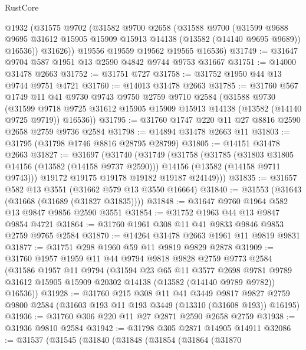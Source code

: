 \begin{lexlean}{RustCore}
\begin{coremodule}
      @1932
      (@31575
        @9702
        (@31582
          @9700
          @2658
          (@31588
            @9700
            (@31599
              @9688
              @9695
              @31612
              @15905
              @15909
              @15913
              @14138
              (@13582 (@14140 @9695 @9689))
              @16536))
          @31626))
      @19556
      @19559
      @19562
      @19565
      @16536)
@31749 := @31647 @9704 @587 @1951 @13 @2590 @4842 @9744 @9753 @31667
@31751 := @14000 @31478 @2663
@31752 := @31751 @727
@31758 := @31752 @1950 @44 @13 @9744 @9751 @4721
@31760 := @14013 @31478 @2663
@31785 := @31760
    @567
    @1749
    @11
    @41
    @9730
    @9743
    @9750
    @2759
    @9710
    @2584
    (@31588
      @9730
      (@31599 @9718 @9725 @31612 @15905 @15909 @15913 @14138 (@13582 (@14140 @9725 @9719)) @16536))
@31795 := @31760 @1747 @220 @11 @27 @8816 @2590 @2658 @2759 @9736 @2584
@31798 := @14894 @31478 @2663 @11
@31803 := @31795 (@31798 @1746 @8816 @28795 @28799)
@31805 := @14151 @31478 @2663
@31827 := @31697
    (@31740
      (@31749
        (@31758
          (@31785
            (@31803 @31805 @14156 (@13582 (@14158 @9737 @2590)))
            @14156
            (@13582 (@14158 @9711 @9743)))
          @19172
          @19175
          @19178
          @19182
          @19187
          @24149)))
@31835 := @31657 @582 @13 @3551 (@31662 @579 @13 @3550 @16664)
@31840 := @31553 (@31643 (@31668 (@31689 (@31827 @31835))))
@31848 := @31647 @9760 @1964 @582 @13 @9847 @9856 @2590 @3551
@31854 := @31752 @1963 @44 @13 @9847 @9854 @4721
@31864 := @31760 @1961 @308 @11 @41 @9833 @9846 @9853 @2759 @9765 @2584
@31870 := @14264 @31478 @2663 @1961 @11 @9819 @9831
@31877 := @31751 @298 @1960 @59 @11 @9819 @9829 @2878
@31909 := @31760
    @1957
    @1959
    @11
    @44
    @9794
    @9818
    @9828
    @2759
    @9773
    @2584
    (@31586
      @1957
      @11
      @9794
      (@31594
        @23
        @65
        @11
        @3577
        @2698
        @9781
        @9789
        @31612
        @15905
        @15909
        @20302
        @14138
        (@13582 (@14140 @9789 @9782))
        @16536))
@31928 := @31760
    @215
    @308
    @11
    @41
    @3449
    @9817
    @9827
    @2759
    @9800
    @2584
    (@31603 @193 @11 @193 @3449 (@13310 (@31608 @193)) @16195)
@31936 := @31760 @306 @220 @11 @27 @2871 @2590 @2658 @2759
@31938 := @31936 @9810 @2584
@31942 := @31798 @305 @2871 @14905 @14911
@32086 := @31537
    (@31545
      (@31840
        (@31848
          (@31854
            (@31864
              (@31870

\end{coremodule}
\end{lexlean}
